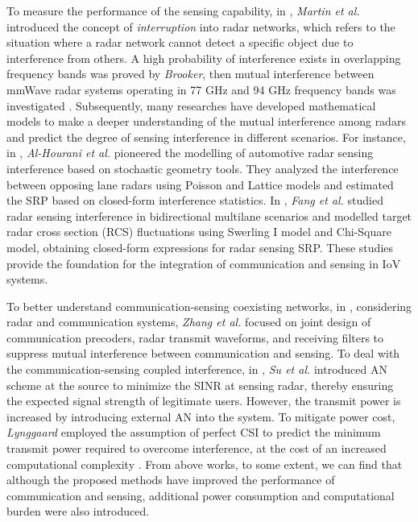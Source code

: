 To measure the performance of the sensing capability, in \cite{braun2013co}, \emph{Martin et al.} introduced the concept of \emph{interruption} into radar networks, which refers to the situation where a radar network cannot detect a specific object due to interference from others. A high probability of interference exists in overlapping frequency bands was proved by \emph{Brooker}, then mutual interference between mmWave radar systems operating in 77 GHz and 94 GHz frequency bands was investigated \cite{brooker2007mutual}. Subsequently, many researches have developed mathematical models to make a deeper understanding of the mutual interference among radars and predict the degree of sensing interference in different scenarios. 
For instance, 
in \cite{al2018stochastic}, \emph{Al-Hourani et al.} pioneered the modelling of automotive radar sensing interference based on stochastic geometry tools. They analyzed the interference between opposing lane radars using Poisson and Lattice models and estimated the SRP based on closed-form interference statistics. 
In \cite{Fang2020Stochastic}, \emph{Fang et al.} studied radar sensing interference in bidirectional multilane scenarios and modelled target radar cross section (RCS) fluctuations using Swerling I model and Chi-Square model, obtaining closed-form expressions for radar sensing SRP. These studies provide the foundation for the integration of communication and sensing in IoV systems.

To better understand communication-sensing coexisting networks, in \cite{Zhang2024Coexistence}, considering radar and communication systems, \emph{Zhang et al.} focused on joint design of communication precoders, radar transmit waveforms, and receiving filters to suppress mutual interference between communication and sensing. 
To deal with the communication-sensing coupled interference, in \cite{su2020secure}, \emph{Su et al.} introduced AN scheme at the source to minimize the SINR at sensing radar, thereby ensuring the expected signal strength of legitimate users. However, the transmit power is increased by introducing external AN into the system. To mitigate power cost, \emph{Lynggaard} employed the assumption of perfect CSI to predict the minimum transmit power required to overcome interference, at the cost of an increased computational complexity \cite{lynggaard2018using}. From above works, to some extent, we can find that although the proposed methods have improved the performance of communication and sensing, additional power consumption and computational burden were also introduced.

